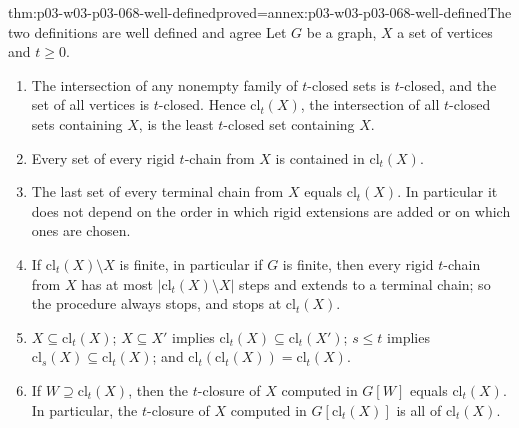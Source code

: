 \begin{hbtheorem}{thm:p03-w03-p03-068-well-defined}{proved=annex:p03-w03-p03-068-well-defined}{The two definitions are well defined and agree}
Let \(G\) be a graph, \(X\) a set of vertices and \(t\geq0\).
\begin{enumerate}
\item The intersection of any nonempty family of \(t\)-closed sets is
\(t\)-closed, and the set of all vertices is \(t\)-closed.  Hence
\(\mathrm{cl}_t(X)\), the intersection of all \(t\)-closed sets containing
\(X\), is the least \(t\)-closed set containing \(X\).
\item Every set of every rigid \(t\)-chain from \(X\) is contained in
\(\mathrm{cl}_t(X)\).
\item The last set of every terminal chain from \(X\) equals
\(\mathrm{cl}_t(X)\).  In particular it does not depend on the order in
which rigid extensions are added or on which ones are chosen.
\item If \(\mathrm{cl}_t(X)\setminus X\) is finite, in particular if \(G\) is
finite, then every rigid \(t\)-chain from \(X\) has at most
\(|\mathrm{cl}_t(X)\setminus X|\) steps and extends to a terminal chain;
so the procedure always stops, and stops at \(\mathrm{cl}_t(X)\).
\item \(X\subseteq\mathrm{cl}_t(X)\);
\(X\subseteq X'\) implies \(\mathrm{cl}_t(X)\subseteq\mathrm{cl}_t(X')\);
\(s\leq t\) implies \(\mathrm{cl}_s(X)\subseteq\mathrm{cl}_t(X)\); and
\(\mathrm{cl}_t(\mathrm{cl}_t(X))=\mathrm{cl}_t(X)\).
\item If \(W\supseteq\mathrm{cl}_t(X)\), then the \(t\)-closure of \(X\)
computed in \(G[W]\) equals \(\mathrm{cl}_t(X)\).  In particular, the
\(t\)-closure of \(X\) computed in \(G[\mathrm{cl}_t(X)]\) is all of
\(\mathrm{cl}_t(X)\).
\end{enumerate}
\end{hbtheorem}

